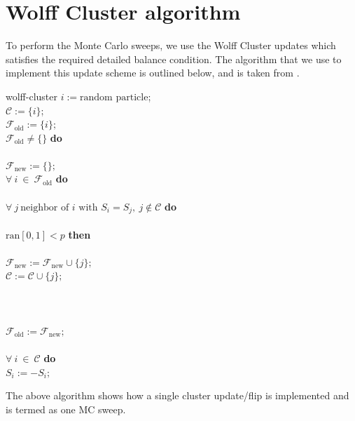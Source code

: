 \documentclass[../journal_main.tex]{subfiles}
\begin{document}
\section{Wolff Cluster algorithm}
To perform the Monte Carlo sweeps, we use the Wolff Cluster updates which satisfies the required detailed balance condition. The algorithm that we use to implement this update scheme is outlined below, and is taken from \cite{krauth}.
\begin{algorithm}{wolff-cluster}
    \> $i:=\text{random particle}$; \\
    \> $\mathcal{C}:=\{ i \}$; \\
    \> $\mathcal{F}_{\text{old}}:=\{i \};$\\
     $\mathcal{F}_{\text{old}} \neq \{ \}$ {\bf do}\\
    \\
    \>\> $\mathcal{F}_{\text{new}}:=\{ \};$\\
    \> $\forall\ i\ \in\ \mathcal{F}_{\text{old}}$ {\bf do}\\
    \>\\
    \>\> $\forall\ j\ \text{neighbor of $i$ with $S_i=S_j$},\ j
     \not \in \mathcal{C} $ {\bf do}\\
    \>\>\\
    \>\>\> $\text{ran}[0,1] < p$ {\bf then}\\
    \>\>\>\\
    \>\>\>\>\>$\mathcal{F}_{\text{new}}:= \mathcal{F}_{\text{new}}\cup \{j\};$\\
    \>\>\>\>\>$\mathcal{C}:= \mathcal{C} \cup \{j\};$\\
    \>\>\>\\
    \>\>\\
    \>\\
    \>\>$\mathcal{F}_{\text{old}}:= \mathcal{F}_{\text{new}};$\\
    \\
     $\forall\ i\ \in\ \mathcal{C}$ {\bf do}\\
    \>$S_i:= -S_i;$\\
\end{algorithm}
The above algorithm shows how a single cluster update/flip is implemented and is termed as one MC sweep. 
\end{document}
